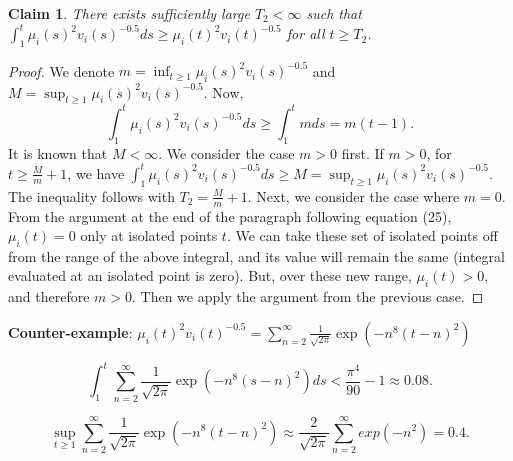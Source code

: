 \documentclass[letterpaper, 11pt]{article}
\newtheorem{claim}{\bfseries Claim}
\begin{document}
\begin{claim}
There exists sufficiently large $T_2 < \infty$ such that $\int_1^t \mu_i(s)^2 v_i(s)^{-0.5} ds \geq \mu_i(t)^2 v_i(t)^{-0.5}$ for all $t \geq T_2$.
\end{claim}

\begin{proof}
We denote $m = \inf_{t \geq 1} \mu_i(s)^2 v_i(s)^{-0.5}$ and $M = \sup_{t \geq 1} \mu_i(s)^2 v_i(s)^{-0.5}$. 
Now, $$\int_1^t \mu_i(s)^2 v_i(s)^{-0.5} ds \geq \int_1^t m ds = m(t-1).$$ 
It is known that $M<\infty$. We consider the case $m>0$ first. If $m>0$, for $t \geq \frac{M}{m}+1$, we have $\int_1^t \mu_i(s)^2 v_i(s)^{-0.5} ds \geq M = \sup_{t\geq 1} \mu_i(s)^2 v_i(s)^{-0.5}$. The inequality follows with $T_2 = \frac{M}{m}+1$. Next, we consider the case where $m=0$. From the argument at the end of the paragraph following equation (25), $\mu_i(t) = 0$ only at isolated points $t$. We can take these set of isolated points off from the range of the above integral, and its value will remain the same (integral evaluated at an isolated point is zero). But, over these new range, $\mu_i(t) > 0$, and therefore $m > 0$. Then we apply the argument from the previous case.
\end{proof}

{\bf Counter-example}: $\mu_i(t)^2 v_i(t)^{-0.5} = \sum_{n=2}^{\infty}\frac{1}{\sqrt{2\pi}}\exp(-n^8(t-n)^2)$

$$\int_1^t \sum_{n=2}^{\infty}\frac{1}{\sqrt{2\pi}}\exp(-n^8(s-n)^2) ds < \frac{\pi^4}{90}-1 \approx 0.08.$$

$$\sup_{t \geq 1} \sum_{n=2}^{\infty}\frac{1}{\sqrt{2\pi}}\exp(-n^8(t-n)^2) \approx \frac{2}{\sqrt{2\pi}} \sum_{n=2}^{\infty} exp(-n^2) = 0.4.$$
\end{document}
